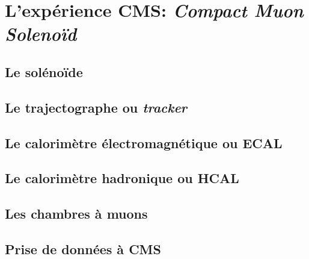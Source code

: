 \section{L'expérience CMS: \emph{Compact Muon Solenoïd}}

\subsection{Le solénoïde}

\subsection{Le trajectographe ou \emph{tracker}}

\subsection{Le calorimètre électromagnétique ou ECAL}

\subsection{Le calorimètre hadronique ou HCAL}

\subsection{Les chambres à muons}

\subsection{Prise de données à CMS}
